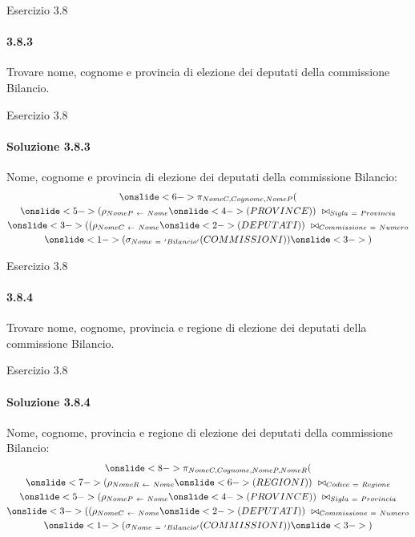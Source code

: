 %
\begin{frame}{Esercizio 3.8}
    \framesubtitle{3.8.3}
    Trovare nome, cognome e provincia di elezione dei deputati della commissione Bilancio.
\end{frame}
%
\begin{frame}{Esercizio 3.8}
    \framesubtitle{Soluzione 3.8.3}
    \vspace*{-1.2cm}
    {\small Nome, cognome e provincia di elezione dei deputati della commissione Bilancio:}
    \small
    \begin{gather*}
        \onslide<6->{\pi_{NomeC,Cognome,NomeP}(}\\
        \onslide<5->{(\rho_{NomeP~\leftarrow~Nome}}
        \onslide<4->{(PROVINCE))~\bowtie_{Sigla~=~Provincia}}\\
        \onslide<3->{((\rho_{NomeC~\leftarrow~Nome}}
        \onslide<2->{(DEPUTATI))~\bowtie_{Commissione~=~Numero}}\\
        \onslide<1->{(\sigma_{Nome~=~'Bilancio'}(COMMISSIONI))}
        \onslide<3->{)}
    \end{gather*}
\end{frame}
%
\begin{frame}{Esercizio 3.8}
    \framesubtitle{3.8.4}
    Trovare nome, cognome, provincia e regione di elezione dei deputati della commissione Bilancio.
\end{frame}
%
\begin{frame}{Esercizio 3.8}
    \framesubtitle{Soluzione 3.8.4}
    \vspace*{-1.2cm}
    {\small Nome, cognome, provincia e regione di elezione dei deputati della commissione Bilancio:}
    \small
    \begin{gather*}
        \onslide<8->{\pi_{NomeC,Cognome,NomeP,NomeR}(}\\
        \onslide<7->{(\rho_{NomeR~\leftarrow~Nome}}
        \onslide<6->{(REGIONI))~\bowtie_{Codice~=~Regione}}\\
        \onslide<5->{(\rho_{NomeP~\leftarrow~Nome}}
        \onslide<4->{(PROVINCE))~\bowtie_{Sigla~=~Provincia}}\\
        \onslide<3->{((\rho_{NomeC~\leftarrow~Nome}}
        \onslide<2->{(DEPUTATI))~\bowtie_{Commissione~=~Numero}}\\
        \onslide<1->{(\sigma_{Nome~=~'Bilancio'}(COMMISSIONI))}
        \onslide<3->{)}
    \end{gather*}
\end{frame}